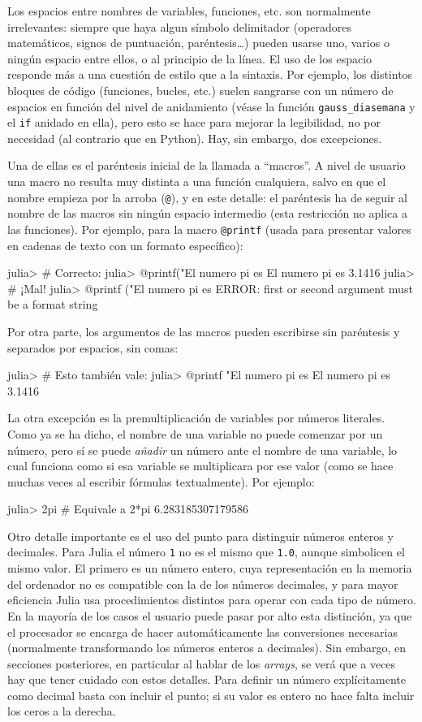 ﻿\documentclass{article}
\newcommand{\code}{\texttt}
\begin{document}
Los espacios entre nombres de variables, funciones, etc. son normalmente irrelevantes: siempre que haya algun símbolo delimitador (operadores matemáticos, signos de puntuación, paréntesis\ldots) pueden usarse uno, varios o ningún espacio entre ellos, o al principio de la línea. El uso de los espacio responde más a una cuestión de estilo que a la sintaxis. Por ejemplo, los distintos bloques de código (funciones, bucles, etc.) suelen sangrarse con un número de espacios en función del nivel de anidamiento (véase la función \code{gauss_diasemana} y el \code{if} anidado en ella), pero esto se hace para mejorar la legibilidad, no por necesidad (al contrario que en Python). Hay, sin embargo, dos excepciones.

Una de ellas es el paréntesis inicial de la llamada a ``macros''. A nivel de usuario una macro no resulta muy distinta a una función cualquiera, salvo en que el nombre empieza por la arroba (\code{@}), y en este detalle: el paréntesis ha de seguir al nombre de las macros sin ningún espacio intermedio (esta restricción no aplica a las funciones). Por ejemplo, para la macro \code{@printf} (usada para presentar valores en cadenas de texto con un formato específico):

julia> # Correcto:
julia> @printf("El numero pi es %
El numero pi es 3.1416
julia> # ¡Mal!
julia> @printf ("El numero pi es %
ERROR: first or second argument must be a format string

Por otra parte, los argumentos de las macros pueden escribirse sin
paréntesis y separados por espacios, sin comas:

julia> # Esto también vale:
julia> @printf "El numero pi es %
El numero pi es 3.1416

La otra excepción es la premultiplicación de variables por números literales. Como ya se ha dicho, el nombre de una variable no puede comenzar por un número, pero sí se puede \emph{añadir} un número ante el nombre de una variable, lo cual funciona como si esa variable se multiplicara por ese valor (como se hace muchas veces al escribir fórmulas textualmente). Por ejemplo:

julia> 2pi # Equivale a 2*pi
6.283185307179586

Otro detalle importante es el uso del punto para distinguir números enteros y decimales. Para Julia el número \code{1} no es el mismo que \code{1.0}, aunque simbolicen el mismo valor. El primero es un número entero, cuya representación en la memoria del ordenador no es compatible con la de los números decimales, y para mayor eficiencia Julia usa procedimientos distintos para operar con cada tipo de número. En la mayoría de los casos el usuario puede pasar por alto esta distinción, ya que el procesador se encarga de hacer automáticamente las conversiones necesarias (normalmente transformando los números enteros a decimales). Sin embargo, en secciones posteriores, en particular al hablar de los \emph{arrays}, se verá que a veces hay que tener cuidado con estos detalles. Para definir un número explícitamente como decimal basta con incluir el punto; si su valor es entero no hace falta incluir los ceros a la derecha.
\end{document}
